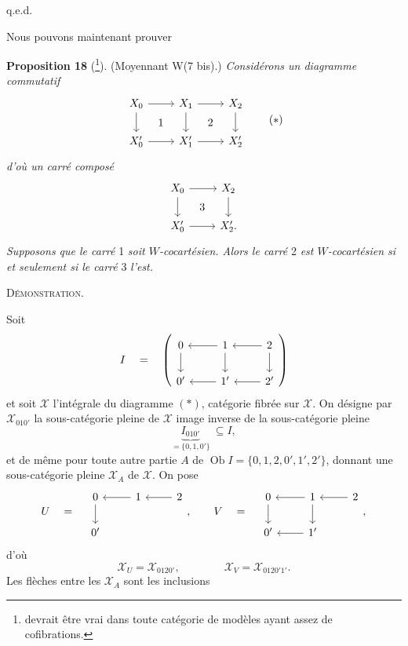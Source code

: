\documentclass[11pt]{article}
\newcommand{\printedpage}[1]{\marginpar{\footnotesize p.~#1}}
\newcommand{\msp}[1]{\marginpar{\footnotesize [#1]}}
\newcommand{\cX}{\mathscr{X}}
\newcommand{\Ob}{\operatorname{Ob}}
\begin{document}
\hfill q.e.d.

Nous pouvons maintenant prouver

\msp{page 236}

\textbf{Proposition 18} (\footnote[127]{devrait être vrai dans toute catégorie de modèles ayant assez de cofibrations.}). (Moyennant W(7 bis).) \textit{Considérons un diagramme commutatif}
\[
\begin{tikzcd}
X_0 \arrow[r] \arrow[d] \arrow[rd, phantom, "1"] & X_1 \arrow[r] \arrow[d] \arrow[rd, phantom, "2"] & X_2 \arrow[d] \\
X'_0 \arrow[r] & X'_1 \arrow[r] & X'_2
\end{tikzcd}
\tag*{$(\ast)$}
\]
\textit{d'où un carré composé}
\[
\begin{tikzcd}
X_0 \arrow[r] \arrow[d] \arrow[rd, phantom, "3"] & X_2 \arrow[d] \\
X'_0 \arrow[r] & X'_2.
\end{tikzcd}
\]
\textit{Supposons que le carré} 1 \textit{soit $W$-cocartésien. Alors le carré} 2 \textit{est $W$-cocartésien si et seulement si le carré} 3 \textit{l'est.}

\textsc{Démonstration.}



\printedpage{152}

Soit
\[
I \quad = \quad
\left(
\begin{tikzcd}
0 \arrow[d] & 1 \arrow[l] \arrow[d] & 2 \arrow[l] \arrow[d] \\
0' & 1' \arrow[l] & 2' \arrow[l]
\end{tikzcd}
\right)
\]
et soit $\cX$ l'intégrale du diagramme $(\ast)$, catégorie fibrée sur $\cX$. On désigne par $\cX_{010'}$ la sous-catégorie pleine de $\cX$ image inverse de la sous-catégorie pleine %
\[
\underbrace{I_{010'}}_{=\{0,1,0'\}} \ \subseteq I,
\]
et de même pour toute autre partie $A$ de $\Ob I = \{0,1,2,0',1',2'\}$, donnant une sous-catégorie pleine $\cX_A$ de $\cX$. On pose
\[
U \quad = \quad
\begin{tikzcd}
0 \arrow[d] & 1 \arrow[l] & 2 \arrow[l] \\
0' & &
\end{tikzcd}
, \qquad
V \quad = \quad
\begin{tikzcd}
0 \arrow[d] & 1 \arrow[l] \arrow[d] & 2 \arrow[l] \\
0' & 1' \arrow[l] &
\end{tikzcd}
,
\]
d'où
\[
\cX_U = \cX_{0120'}, \qquad\qquad \cX_V = \cX_{0120'1'}.
\]
Les flèches entre les $\cX_A$ sont les inclusions
\end{document}
